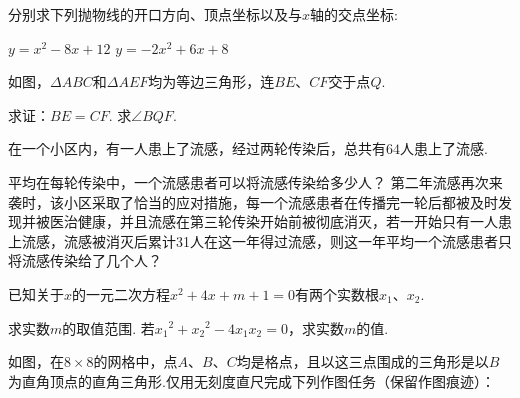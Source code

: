 \documentclass[10pt]{article}
\begin{document}
\begin{questions}{\answeringintroduction}
    \question 分别求下列抛物线的开口方向、顶点坐标以及与$x$轴的交点坐标:
    \begin{subquestions}
        \subquestion $y=x^2-8x+12$
        \subquestion $y=-2x^2+6x+8$
    \end{subquestions}
    \addemptyline\addemptyline\addemptyline\addemptyline
    \question 如图，$\Delta ABC$和$\Delta AEF$均为等边三角形，连$BE$、$CF$交于点$Q$.
    \begin{subquestions}
        \subquestion 求证：$BE=CF$.
        \subquestion 求$\angle BQF$.
    \end{subquestions}
    \begin{figure}[!htb]
        \raggedleft
    \end{figure}
    \question 在一个小区内，有一人患上了流感，经过两轮传染后，总共有$64$人患上了流感.
    \begin{subquestions}
        \subquestion 平均在每轮传染中，一个流感患者可以将流感传染给多少人？
        \subquestion 第二年流感再次来袭时，该小区采取了恰当的应对措施，每一个流感患者在传播完一轮后都被及时发现并被医治健康，并且流感在第三轮传染开始前被彻底消灭，若一开始只有一人患上流感，流感被消灭后累计31人在这一年得过流感，则这一年平均一个流感患者只将流感传染给了几个人？
    \end{subquestions}
    \newpage
    \question 已知关于$x$的一元二次方程$x^2+4x+m+1=0$有两个实数根$x_1$、$x_2$.
    \begin{subquestions}
        \subquestion 求实数$m$的取值范围.
        \subquestion 若${x_1}^2+{x_2}^2-4{x_1}{x_2}=0$，求实数$m$的值.
    \end{subquestions}
    \addspace
    \question 如图，在$8 \times 8$的网格中，点$A$、$B$、$C$均是格点，且以这三点围成的三角形是以$B$为直角顶点的直角三角形.仅用无刻度直尺完成下列作图任务（保留作图痕迹）：

\end{questions}
\end{document}
